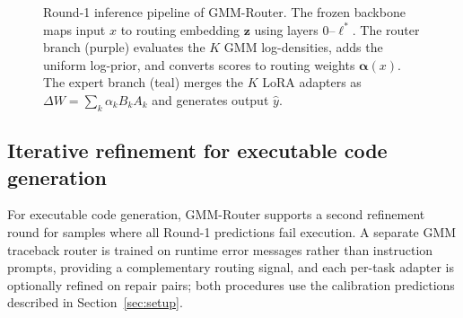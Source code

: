\begin{figure}[t]
{}
\caption{Round-1 inference pipeline of GMM-Router. The frozen backbone maps input $x$ to routing embedding $\mathbf{z}$ using layers $0$--$\ell^*$. The router branch (purple) evaluates the $K$ GMM log-densities, adds the uniform log-prior, and converts scores to routing weights $\bm{\alpha}(x)$. The expert branch (teal) merges the $K$ LoRA adapters as $\Delta W=\sum_k\alpha_k B_k A_k$ and generates output $\hat{y}$.}
\label{fig:arch}
\end{figure}

\subsection{Iterative refinement for executable code generation}
\label{sec:traceback}

For executable code generation, GMM-Router supports a second refinement round for samples where all Round-1 predictions fail execution. A separate GMM traceback router is trained on runtime error messages rather than instruction prompts, providing a complementary routing signal, and each per-task adapter is optionally refined on repair pairs; both procedures use the calibration predictions described in Section~\ref{sec:setup}.

